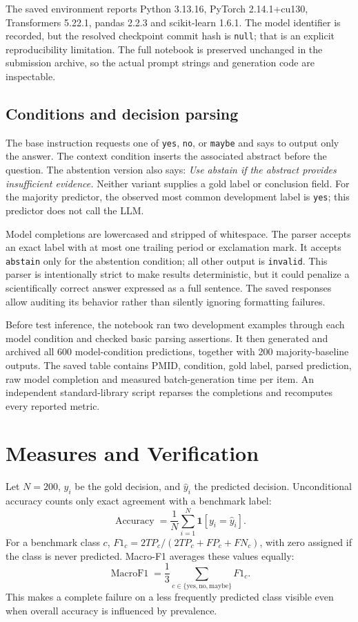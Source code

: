 \documentclass[conference]{IEEEtran}
\begin{document}
The saved environment reports Python 3.13.16, PyTorch 2.14.1+cu130, Transformers 5.22.1, pandas 2.2.3 and scikit-learn 1.6.1. The model identifier is recorded, but the resolved checkpoint commit hash is \texttt{null}; that is an explicit reproducibility limitation. The full notebook is preserved unchanged in the submission archive, so the actual prompt strings and generation code are inspectable.

\subsection{Conditions and decision parsing}
The base instruction requests one of \texttt{yes}, \texttt{no}, or \texttt{maybe} and says to output only the answer. The context condition inserts the associated abstract before the question. The abstention version also says: \emph{Use abstain if the abstract provides insufficient evidence.} Neither variant supplies a gold label or conclusion field. For the majority predictor, the observed most common development label is \texttt{yes}; this predictor does not call the LLM.

Model completions are lowercased and stripped of whitespace. The parser accepts an exact label with at most one trailing period or exclamation mark. It accepts \texttt{abstain} only for the abstention condition; all other output is \texttt{invalid}. This parser is intentionally strict to make results deterministic, but it could penalize a scientifically correct answer expressed as a full sentence. The saved responses allow auditing its behavior rather than silently ignoring formatting failures.

Before test inference, the notebook ran two development examples through each model condition and checked basic parsing assertions. It then generated and archived all 600 model-condition predictions, together with 200 majority-baseline outputs. The saved table contains PMID, condition, gold label, parsed prediction, raw model completion and measured batch-generation time per item. An independent standard-library script reparses the completions and recomputes every reported metric.

\section{Measures and Verification}
Let $N=200$, $y_i$ be the gold decision, and $\hat{y}_i$ the predicted decision. Unconditional accuracy counts only exact agreement with a benchmark label:
\begin{equation}
\operatorname{Accuracy}=\frac{1}{N}\sum_{i=1}^{N}\mathbf{1}[y_i=\hat{y}_i].
\label{eq:acc}
\end{equation}
For a benchmark class $c$, $F1_c=2TP_c/(2TP_c+FP_c+FN_c)$, with zero assigned if the class is never predicted. Macro-F1 averages these values equally:
\begin{equation}
\operatorname{MacroF1}=\frac{1}{3}\sum_{c\in\{\mathrm{yes,no,maybe}\}} F1_c.
\label{eq:macro}
\end{equation}
This makes a complete failure on a less frequently predicted class visible even when overall accuracy is influenced by prevalence.
\end{document}
